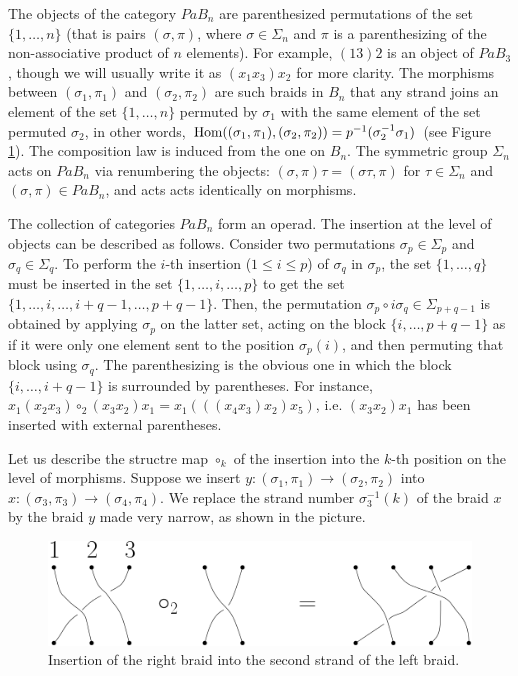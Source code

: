 \documentclass[TFM.tex]{subfiles}
\begin{document}
The objects of the category $PaB_n$ are parenthesized permutations of the set $\{1,\dots, n\}$ (that is pairs $(\sigma,\pi)$, where $\sigma\in\Sigma_n$ and $\pi$ is a parenthesizing of the non-associative product of $n$ elements). For example, $(13)2$ is an object of $PaB_3$, though we will usually write it as $(x_1x_3)x_2$ for more clarity. The morphisms between $(\sigma_1,\pi_1)$ and $(\sigma_2,\pi_2)$ are such braids in $B_n$ that any strand joins an element of the set $\{1,\dots, n\}$ permuted by $\sigma_1$ with the same element of the set permuted $\sigma_2$, in other words, $\operatorname{Hom}((\sigma_1,\pi_1),(\sigma_2,\pi_2))=p^{-1}(\sigma_2^{-1}\sigma_1)$ (see Figure \ref{morfismo}). The composition law is induced from the one on $B_n$. The symmetric group $\Sigma_n$ acts on $PaB_n$ via renumbering the objects: $(\sigma,\pi)\tau=(\sigma\tau,\pi)$ for $\tau\in\Sigma_n$ and $(\sigma,\pi)\in PaB_n$, and acts acts identically on morphisms.


The collection of categories $PaB_n$ form an operad. %
The insertion at the level of objects can be described as follows. Consider two permutations $\sigma_p\in\Sigma_p$ and $\sigma_q\in\Sigma_q$. To perform the $i$-th insertion ($1\leq i\leq p$) of $\sigma_q$ in $\sigma_p$, the set $\{1,\dots, q\}$ must be inserted in the set $\{1,\dots, i,\dots, p\}$ to get the set $\{1,\dots, i,\dots,i+q-1,\dots, p+q-1\}$. Then, the permutation $\sigma_{p}\circ i\sigma_q\in\Sigma_{p+q-1}$ is obtained by applying $\sigma_p$ on the latter set, acting on the block $\{i,\dots, p+q-1\}$ as if it were only one element sent to the position $\sigma_p(i)$, and then permuting that block using $\sigma_q$. The parenthesizing is the obvious one in which the block $\{i,\dots, i+q-1\}$ is surrounded by parentheses. For instance, $x_1(x_2x_3)\circ_2(x_3x_2)x_1=x_1(((x_4x_3)x_2)x_5)$, i.e. $(x_3x_2)x_1$ has been inserted with external parentheses.

Let us describe the structre map $\circ_k$ of the insertion into the $k$-th position on the level of morphisms. Suppose we insert $y:(\sigma_1,\pi_1)\to (\sigma_2,\pi_2)$ into $x:(\sigma_3,\pi_3)\to(\sigma_4,\pi_4)$. We replace the strand number $\sigma^{-1}_3(k)$ of the braid $x$ by the braid $y$ made very narrow, as shown in the picture.

\begin{figure}[h!]
\includegraphics[scale=0.7]{Imagenes/insercion.png}
\caption{Insertion of the right braid into the second strand of the left braid.}\label{morfismo}
\end{figure}
\end{document}
